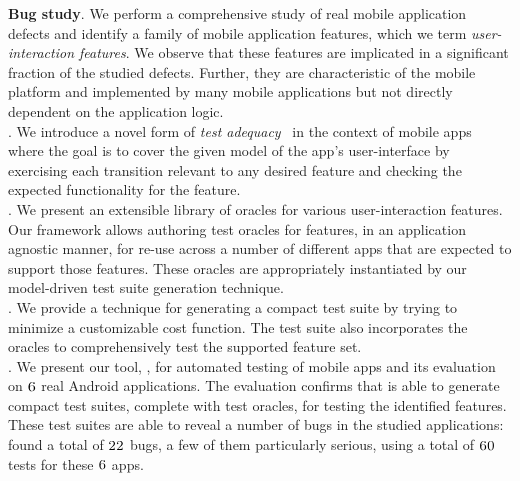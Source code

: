 {\bf Bug study}.  We perform a comprehensive study of
          real mobile application defects and identify a family of
          mobile application features, which we term \textit{user-interaction features}. We observe that these features are 
          implicated in a significant fraction of the studied defects. 
          Further, they are characteristic of the mobile platform and implemented 
          by many mobile applications but not directly dependent on the
          application logic.          
\\
{}.   We introduce a novel form of
          \emph{test adequacy}~\cite{GoodenoughGerhart1975} in the context of mobile apps where the
          goal is to cover the given model of the app's user-interface
          by exercising each transition relevant to any desired
          feature and checking the expected functionality for the feature.
\\
{}. We present an extensible 
				  library of oracles for various user-interaction features.
				  Our framework allows authoring test oracles for features, in an
	        application agnostic manner, for re-use across a number of
	        different apps that are expected to support those features.   
	        These oracles are appropriately instantiated by our model-driven
	        test suite generation technique. 
\\
{}. We provide a technique for generating a
          compact test suite by trying to minimize a customizable cost function. 
          The test suite also incorporates the oracles to comprehensively test the supported feature set.
\\
{}.  We present our tool, \tool{}, for
          automated testing of mobile apps and its evaluation on
          $\textsc{6}$ real Android applications.  The evaluation
          confirms that \tool{} is able to generate compact
          test suites, complete with test oracles, for testing the
          identified features. These test suites are able to reveal
          a number of bugs in the studied
          applications: \tool{} found a total of $\textsc{22}$ bugs, 
          a few of them particularly serious, using a total of $\textsc{60}$ tests for these $\textsc{6}$ apps.

